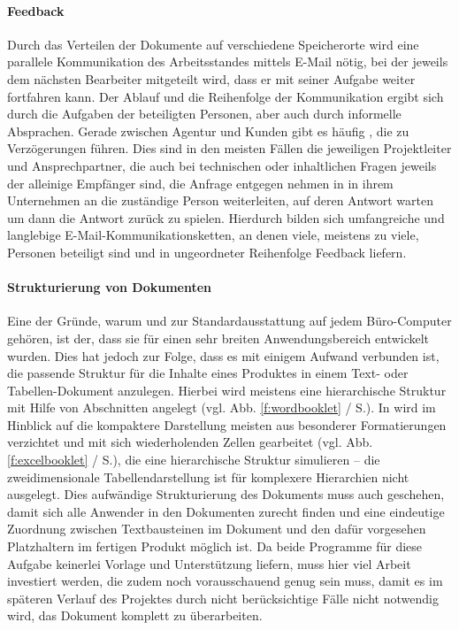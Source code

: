 \paragraph{Feedback} Durch das Verteilen der Dokumente auf verschiedene Speicherorte wird eine parallele Kommunikation des Arbeitsstandes mittels E-Mail nötig, bei der jeweils dem nächsten Bearbeiter mitgeteilt wird, dass er mit seiner Aufgabe weiter fortfahren kann. Der Ablauf und die Reihenfolge der Kommunikation ergibt sich durch die Aufgaben der beteiligten Personen, aber auch durch informelle Absprachen. Gerade zwischen Agentur und Kunden gibt es häufig , die zu Verzögerungen führen. Dies sind in den meisten Fällen die jeweiligen Projektleiter und Ansprechpartner, die auch bei technischen oder inhaltlichen Fragen jeweils der alleinige Empfänger sind, die Anfrage entgegen nehmen in in ihrem Unternehmen an die zuständige Person weiterleiten, auf deren Antwort warten um dann die Antwort zurück zu spielen. Hierdurch bilden sich umfangreiche und langlebige E-Mail-Kommunikationsketten, an denen viele, meistens zu viele, Personen beteiligt sind und in ungeordneter Reihenfolge Feedback liefern.

\paragraph{Strukturierung von Dokumenten} Eine der Gründe, warum  und  zur Standardausstattung auf jedem Büro-Computer gehören, ist der, dass sie für einen sehr breiten Anwendungsbereich entwickelt wurden. Dies hat jedoch zur Folge, dass es mit einigem Aufwand verbunden ist, die passende Struktur für die Inhalte eines Produktes in einem Text- oder Tabellen-Dokument anzulegen. Hierbei wird meistens eine hierarchische Struktur mit Hilfe von Abschnitten angelegt (vgl. Abb. \ref{f:wordbooklet} / S.\pageref{f:wordbooklet}). In  wird im Hinblick auf die kompaktere Darstellung meisten aus besonderer Formatierungen verzichtet und mit sich wiederholenden Zellen gearbeitet (vgl. Abb. \ref{f:excelbooklet} / S.\pageref{f:excelbooklet}), die eine hierarchische Struktur simulieren -- die zweidimensionale Tabellendarstellung ist für komplexere Hierarchien nicht ausgelegt. Dies aufwändige Strukturierung des Dokuments muss auch geschehen, damit sich alle Anwender in den Dokumenten zurecht finden und eine eindeutige Zuordnung zwischen Textbausteinen im Dokument und den dafür vorgesehen Platzhaltern im fertigen Produkt möglich ist. Da beide Programme für diese Aufgabe keinerlei Vorlage und Unterstützung liefern, muss hier viel Arbeit investiert werden, die zudem noch vorausschauend genug sein muss, damit es im späteren Verlauf des Projektes durch nicht berücksichtige Fälle nicht notwendig wird, das Dokument komplett zu überarbeiten.

